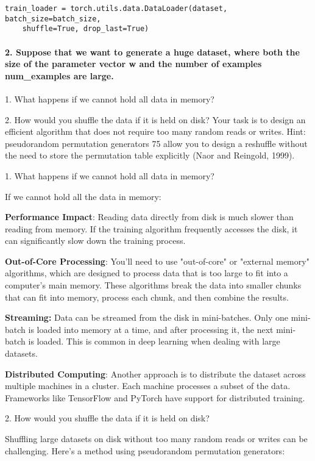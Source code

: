 \begin{verbatim}
train_loader = torch.utils.data.DataLoader(dataset, batch_size=batch_size,
    shuffle=True, drop_last=True)
\end{verbatim}

\paragraph{2. Suppose that we want to generate a huge dataset, where both the size of the parameter vector w and the number of examples num\_examples are large.}

1. What happens if we cannot hold all data in memory?

2. How would you shuffle the data if it is held on disk? Your task is to design an eﬀicient algorithm that does not require too many random reads or writes.
Hint: pseudorandom permutation generators 75 allow you to design a reshuffle without the need to store the permutation table explicitly (Naor and Reingold, 1999).

1. What happens if we cannot hold all data in memory?

If we cannot hold all the data in memory:

\textbf{Performance Impact}: Reading data directly from disk is much slower than reading from memory. If the training algorithm frequently accesses the disk, it can significantly slow down the training process.

\textbf{Out-of-Core Processing}: You'll need to use "out-of-core" or "external memory" algorithms, which are designed to process data that is too large to fit into a computer's main memory.
These algorithms break the data into smaller chunks that can fit into memory, process each chunk, and then combine the results.

\textbf{Streaming:} Data can be streamed from the disk in mini-batches.
Only one mini-batch is loaded into memory at a time, and after processing it, the next mini-batch is loaded.
This is common in deep learning when dealing with large datasets.

\textbf{Distributed Computing}: Another approach is to distribute the dataset across multiple machines in a cluster.
Each machine processes a subset of the data. Frameworks like TensorFlow and PyTorch have support for distributed training.

2. How would you shuffle the data if it is held on disk?

Shuffling large datasets on disk without too many random reads or writes can be challenging. Here's a method using pseudorandom permutation generators:

